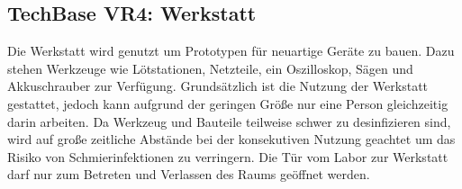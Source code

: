 \subsection{TechBase VR4: Werkstatt}


\noindent
Die Werkstatt wird genutzt um Prototypen für neuartige Geräte zu bauen.
Dazu stehen Werkzeuge wie Lötstationen, Netzteile, ein Oszilloskop, Sägen und Akkuschrauber zur Verfügung.
Grundsätzlich ist die Nutzung der Werkstatt gestattet, jedoch kann aufgrund der geringen Größe nur eine Person gleichzeitig darin arbeiten.
Da Werkzeug und Bauteile teilweise schwer zu desinfizieren sind, wird auf große zeitliche Abstände bei der konsekutiven Nutzung geachtet um das Risiko von Schmierinfektionen zu verringern.
Die Tür vom Labor zur Werkstatt darf nur zum Betreten und Verlassen des Raums geöffnet werden.
